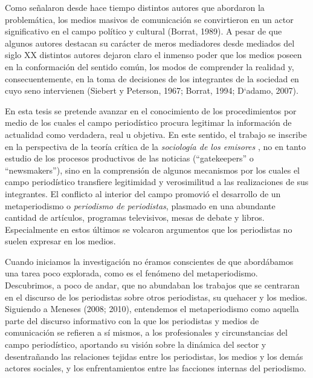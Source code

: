 Como señalaron desde hace tiempo distintos autores que abordaron la problemática, los medios masivos de comunicación se convirtieron en un actor significativo en el campo político y cultural (Borrat, 1989). A pesar de que algunos autores destacan su carácter de meros mediadores  desde mediados del siglo XX distintos autores dejaron claro el inmenso poder que los medios poseen en la conformación del sentido común, los modos de comprender la realidad y, consecuentemente, en la toma de decisiones de los integrantes de la sociedad en cuyo seno intervienen (Siebert y Peterson, 1967; Borrat, 1994; D`adamo, 2007).

En esta tesis se pretende avanzar en el conocimiento de los procedimientos por medio de los cuales el campo periodístico procura legitimar la información de actualidad como verdadera, real u objetiva. En este sentido, el trabajo se inscribe en la perspectiva de la teoría crítica de la \emph{sociología de los emisores} \parencite{@6975-WOLF2004}, no en tanto estudio de los procesos productivos de las noticias (``gatekeepers'' o ``newsmakers''), sino en la comprensión de algunos mecanismos por los cuales el campo periodístico transfiere legitimidad y verosimilitud a las realizaciones de sus integrantes. El conflicto al interior del campo promovió el desarrollo de un metaperiodismo o \emph{periodismo de periodistas}, plasmado en una abundante cantidad de artículos, programas televisivos, mesas de debate y libros. Especialmente en estos últimos se volcaron argumentos que los periodistas no suelen expresar en los medios.

Cuando iniciamos la investigación no éramos conscientes de que abordábamos una tarea poco explorada, como es el fenómeno del metaperiodismo. Descubrimos, a poco de andar, que no abundaban los trabajos que se centraran en el discurso de los periodistas sobre otros periodistas, su quehacer y los medios. Siguiendo a Meneses (2008; 2010), entendemos el metaperiodismo como aquella parte del discurso informativo con la que los periodistas y medios de comunicación se refieren a sí mismos, a los profesionales y circunstancias del campo periodístico, aportando su visión sobre la dinámica del sector y desentrañando las relaciones tejidas entre los periodistas, los medios y los demás actores sociales, y los enfrentamientos entre las facciones internas del periodismo.


